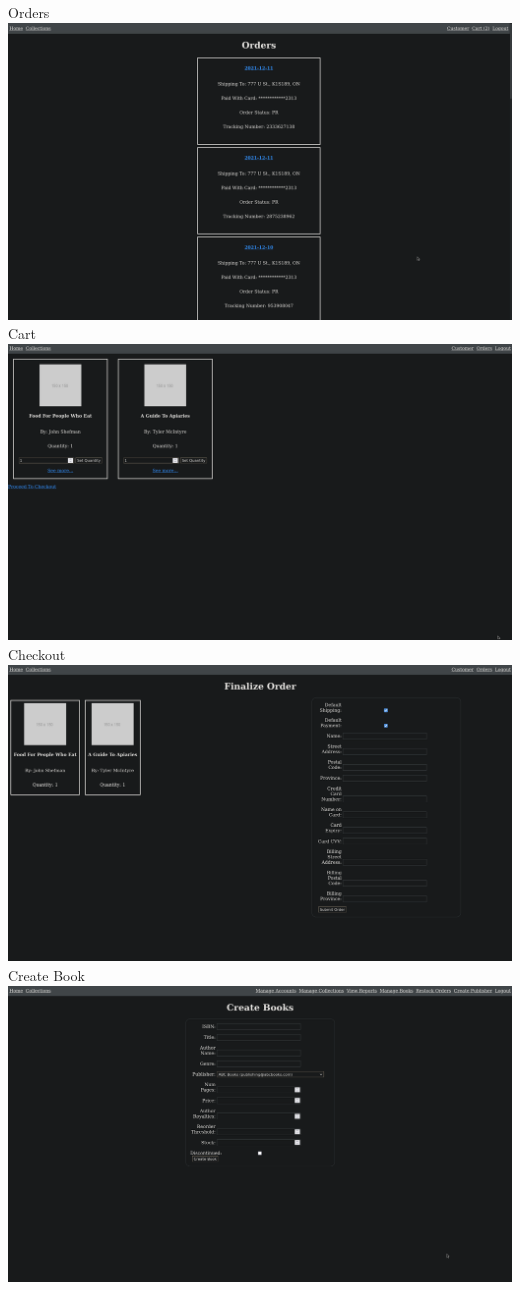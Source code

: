 \documentclass{article}
\begin{document}
\begin{center}
  Orders
  \includegraphics[width=\textwidth]{orders}
  Cart
  \includegraphics[width=\textwidth]{cart}
  Checkout
  \includegraphics[width=\textwidth]{checkout}
  Create Book
  \includegraphics[width=\textwidth]{create_books}
\end{center}
\end{document}
